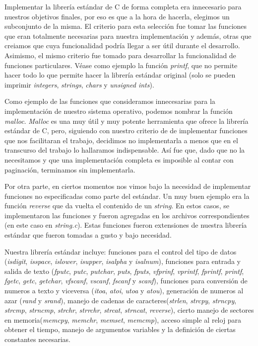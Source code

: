 \documentclass[a4paper,10pt]{article}
\begin{document}
    Implementar la librería estándar de C de forma completa era innecesario para nuestros objetivos finales, por eso es que a la hora de hacerla, elegimos un subconjunto de la misma. El criterio para esta selección fue tomar las funciones que eran totalmente necesarias para nuestra implementación y además, otras que creiamos que cuya funcionalidad podría llegar a ser útil durante el desarrollo.
    Asimismo, el mismo criterio fue tomado para desarrollar la funcionalidad de funciones particulares. Véase como ejemplo la función \textit{printf}, que no permite hacer todo lo que permite hacer la librería estándar original (solo se pueden imprimir \textit{integers}, \textit{strings}, \textit{chars} y \textit{unsigned ints}).
    
    Como ejemplo de las funciones que consideramos innecesarias para la implementación de nuestro sistema operativo, podemos nombrar la función \textit{malloc}. 
    \textit{Malloc} es una muy útil y muy potente herramienta que ofrece la librería estándar de C, pero, siguiendo con nuestro criterio de de implementar funciones que 
    nos facilitaran el trabajo, decidimos no implementarla a menos que en el transcurso del trabajo lo hallaramos indispensable. Así fue que, dado que no la necesitamos y
    que una implementación completa es imposible al contar con paginación, terminamos sin implementarla.

    Por otra parte, en ciertos momentos nos vimos bajo la necesidad de implementar funciones no especificadas como parte del estándar. Un muy buen ejemplo era la función \textit{reverse} que da vuelta el contenido de un \textit{string}. En estos casos, se implementaron las funciones y fueron agregadas en los archivos correspondientes (en este caso en \textit{string.c}). Estas funciones fueron extensiones de nuestra librería estándar que fueron tomadas a gusto y bajo necesidad.

    Nuestra librería estándar incluye: funciones para el control del tipo de datos (\textit{isdigit}, \textit{isspace}, \textit{islower}, \textit{isupper}, \textit{isalpha} y \textit{isalnum}), funciones para entrada y salida de texto (\textit{fputc}, \textit{putc}, \textit{putchar}, \textit{puts}, \textit{fputs}, \textit{vfprinf}, \textit{vprintf}, \textit{fprintf}, \textit{printf}, \textit{fgetc}, \textit{getc}, \textit{getchar}, \textit{vfscanf}, \textit{vscanf}, \textit{fscanf} y \textit{scanf}), funciones para conversión de numeros a texto y viceversa (\textit{itoa}, \textit{atoi}, \textit{utoa} y \textit{atou}), generación de numeros al azar (\textit{rand} y \textit{srand}), manejo de cadenas de caracteres(\textit{strlen}, \textit{strcpy}, \textit{strncpy}, \textit{strcmp}, \textit{strncmp}, \textit{strchr}, \textit{strrchr}, \textit{strcat}, \textit{strncat}, \textit{reverse}), cierto manejo de sectores en memoria(\textit{memcpy}, \textit{memchr}, \textit{memset}, \textit{memcmp}), acceso simple al reloj para obtener el tiempo, manejo de argumentos variables y la definición de ciertas constantes necesarias.
\end{document}
